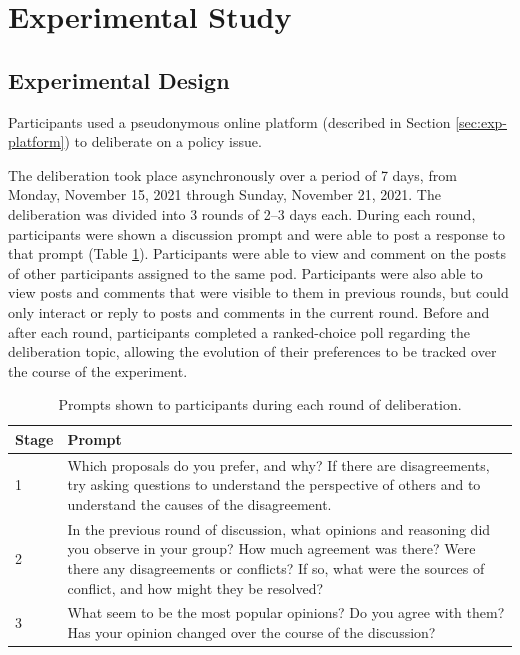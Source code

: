 \section{Experimental Study}
\label{sec:experiment}

\subsection{Experimental Design}

Participants used a pseudonymous online platform (described in Section \ref{sec:exp-platform}) to deliberate on a policy issue.

The deliberation took place asynchronously over a period of 7 days, from Monday, November 15, 2021 through Sunday, November 21, 2021.
The deliberation was divided into 3 rounds of 2--3 days each.
During each round, participants were shown a discussion prompt and were able to post a response to that prompt (Table \ref{tab:prompts}).
Participants were able to view and comment on the posts of other participants assigned to the same pod.
Participants were also able to view posts and comments that were visible to them in previous rounds, but could only interact or reply to posts and comments in the current round.
Before and after each round, participants completed a ranked-choice poll regarding the deliberation topic, allowing the evolution of their preferences to be tracked over the course of the experiment.

\begin{table}
\center
\begin{tabular}{|p{0.5in}|p{4.5in}|}
\hline
Stage & Prompt \\
\hline
1 &
Which proposals do you prefer, and why?
If there are disagreements, try asking questions to understand the perspective
of others and to understand the causes of the disagreement.
\\
\hline
2 & In the previous round of discussion, what opinions and reasoning did you
observe in your group?
How much agreement was there?
Were there any disagreements or conflicts?
If so, what were the sources of conflict, and how might they be resolved?
\\
\hline
3 &
What seem to be the most popular opinions?
Do you agree with them?
Has your opinion changed over the course of the discussion?
\\
\hline
\end{tabular}
\caption{Prompts shown to participants during each round of deliberation.}
\label{tab:prompts}
\end{table}

